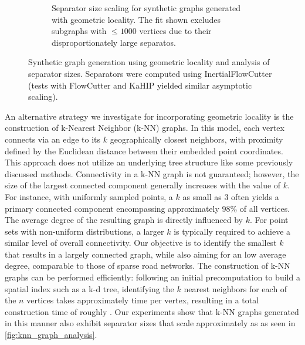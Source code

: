 \begin{figure}[tbhp]
\begin{subfigure}{0.55\linewidth}
		\caption{Separator size scaling for synthetic graphs generated with geometric locality. The fit shown excludes subgraphs with \( \le 1000 \) vertices due to their disproportionately large separatos. }
		\label{fig:geometric_locality_sep_plot}
	\end{subfigure}
	\caption{Synthetic graph generation using geometric locality and analysis of separator sizes. Separators were computed using InertialFlowCutter (tests with FlowCutter and KaHIP yielded similar asymptotic scaling).}
	\label{fig:geometric_locality_separators}
\end{figure}

An alternative strategy we investigate for incorporating geometric locality is the construction of k-Nearest Neighbor (k-NN) graphs.
In this model, each vertex connects via an edge to its \(k\) geographically closest neighbors, with proximity defined by the Euclidean distance between their embedded point coordinates.
This approach does not utilize an underlying tree structure like some previously discussed methods.
Connectivity in a k-NN graph is not guaranteed; however, the size of the largest connected component generally increases with the value of \(k\).
For instance, with uniformly sampled points, a \(k\) as small as 3 often yields a primary connected component encompassing approximately 98\% of all vertices.
The average degree of the resulting graph is directly influenced by \(k\).
For point sets with non-uniform distributions, a larger \(k\) is typically required to achieve a similar level of overall connectivity.
Our objective is to identify the smallest \(k\) that results in a largely connected graph, while also aiming for an low average degree, comparable to those of sparse road networks.
The construction of k-NN graphs can be performed efficiently: following an initial  precomputation to build a spatial index such as a k-d tree, identifying the \(k\) nearest neighbors for each of the \(n\) vertices takes approximately  time per vertex, resulting in a total construction time of roughly .
Our experiments show that k-NN graphs generated in this manner also exhibit separator sizes that scale approximately as  as seen in \cref{fig:knn_graph_analysis}.

